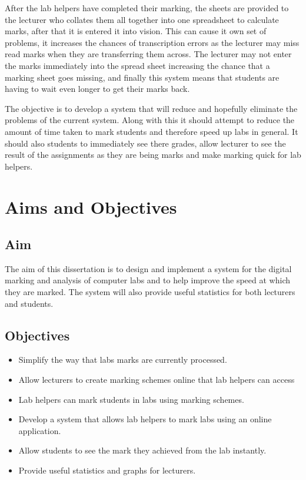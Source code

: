 \documentclass[12pt]{article}  %
\begin{document}
After the lab helpers have completed their marking, the sheets are provided to the lecturer who collates them all together into one spreadsheet to calculate marks, after that it is entered it into vision. This can cause it own set of problems, it increases the chances of transcription errors as the lecturer may miss read marks when they are transferring them across. The lecturer may not enter the marks immediately into the spread sheet increasing the chance that a marking sheet goes missing, and finally this system means that students are having to wait even longer to get their marks back.

The objective is to develop a system that will reduce and hopefully eliminate the problems of the current system. Along with this it should attempt to reduce the amount of time taken to mark students and therefore speed up labs in general. It should also students to immediately see there grades, allow lecturer to see the result of the assignments as they are being marks and make marking quick for lab helpers. 

\newpage
\section{Aims and Objectives}
\subsection{Aim}
The aim of this dissertation is to design and implement a system for the digital marking and analysis of computer labs and to help improve the speed at which they are marked. The system will also provide useful statistics for both lecturers and students.

\subsection{Objectives}
\begin{itemize}
\item Simplify the way that labs marks are currently processed.
\item Allow lecturers to create marking schemes online that lab helpers can access
\item Lab helpers can mark students in labs using marking schemes.
\item Develop a system that allows lab helpers to mark labs using an online application.
\item Allow students to see the mark they achieved from the lab instantly.
\item Provide useful statistics and graphs for lecturers.
\end{itemize}
\end{document}
